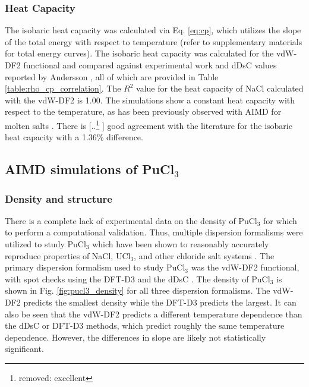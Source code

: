 \documentclass[review]{elsarticle}
\providecommand{\DIFaddtex}[1]{{\protect\color{blue} \sf #1}} %
\providecommand{\DIFdeltex}[1]{{\protect\color{red} [..\footnote{removed: #1} ]}} %
\providecommand{\DIFaddbegin}{} %
\providecommand{\DIFaddend}{} %
\providecommand{\DIFdelbegin}{} %
\providecommand{\DIFdelend}{} %
\providecommand{\DIFadd}[1]{\texorpdfstring{\DIFaddtex{#1}}{#1}} %
\providecommand{\DIFdel}[1]{\texorpdfstring{\DIFdeltex{#1}}{}} %
\newcommand{\DIFscaledelfig}{0.5}
\newlength{\DIFdelgraphicswidth} %
\newlength{\DIFdelgraphicsheight} %
\newcommand{\DIFaddincludegraphics}[2][]{{\color{blue}\fbox{\DIFOincludegraphics[#1]{#2}}}} %
\newcommand{\DIFdelincludegraphics}[2][]{%
\sbox{\DIFdelgraphicsbox}{\DIFOincludegraphics[#1]{#2}}%
\settoboxwidth{\DIFdelgraphicswidth}{\DIFdelgraphicsbox} %
\settoboxtotalheight{\DIFdelgraphicsheight}{\DIFdelgraphicsbox} %
\scalebox{\DIFscaledelfig}{%
\parbox[b]{\DIFdelgraphicswidth}{\usebox{\DIFdelgraphicsbox}\\[-\baselineskip] \rule{\DIFdelgraphicswidth}{0em}}\llap{\resizebox{\DIFdelgraphicswidth}{\DIFdelgraphicsheight}{%
\setlength{\unitlength}{\DIFdelgraphicswidth}%
\begin{picture}(1,1)%
\thicklines\linethickness{2pt} %
{\color[rgb]{1,0,0}\put(0,0){\framebox(1,1){}}}%
{\color[rgb]{1,0,0}\put(0,0){\line( 1,1){1}}}%
{\color[rgb]{1,0,0}\put(0,1){\line(1,-1){1}}}%
\end{picture}%
}\hspace*{3pt}}} %
} %
\DeclareRobustCommand{\DIFaddbegin}{\DIFOaddbegin \let\includegraphics\DIFaddincludegraphics} %
\DeclareRobustCommand{\DIFaddend}{\DIFOaddend \let\includegraphics\DIFOincludegraphics} %
\DeclareRobustCommand{\DIFdelbegin}{\DIFOdelbegin \let\includegraphics\DIFdelincludegraphics} %
\DeclareRobustCommand{\DIFdelend}{\DIFOaddend \let\includegraphics\DIFOincludegraphics} %
\begin{document}
\subsubsection{Heat Capacity}
The isobaric heat capacity was calculated via Eq. \ref{eq:cp}, which utilizes the slope of the total energy with respect to temperature \DIFaddbegin \DIFadd{(refer to supplementary materials for total energy curves)}\DIFaddend . The isobaric heat capacity was calculated for the vdW-DF2 functional and compared against experimental work \cite{nist_ref} and dDsC values reported by Andersson \cite{ANDERSSON2022153836}, all of which are provided in Table \ref{table:rho_cp_correlation}. The $R^2$ value for the heat capacity of NaCl calculated with the vdW-DF2 is 1.00. The simulations show a constant heat capacity with respect to the temperature, as has been previously observed with AIMD for molten salts \cite{duemmler_naclmgcl, karlsson2022synthesis, yuan2019specific, redkin2015heat}. There is \DIFdelbegin \DIFdel{excellent }\DIFdelend \DIFaddbegin \DIFadd{good }\DIFaddend agreement with the literature for the isobaric heat capacity with a 1.36\% difference. 

\subsection{AIMD simulations of PuCl$_3$}
\subsubsection{Density and structure}
There is a complete lack of experimental data on the density of PuCl$_3$ for which to perform a computational validation. Thus, multiple dispersion formalisms were utilized to study PuCl$_3$ which have been shown to reasonably accurately reproduce properties of NaCl, UCl$_3$, and other chloride salt systems \cite{duemmler_liclkcl,duemmler_naclmgcl, ANDERSSON2022153836}. The primary dispersion formalism used to study PuCl$_3$ was the vdW-DF2 functional, with spot checks using the DFT-D3\cite{Grimme2010,grimme2011effect} and the dDsC \cite{steinmann2011comprehensive, steinmann2011generalized}. The density of PuCl$_3$ is shown in Fig. \ref{fig:pucl3_density} for all three dispersion formalisms. The vdW-DF2 predicts the smallest density while the DFT-D3 predicts the largest. It can also be seen that the vdW-DF2 predicts a different temperature dependence than the dDsC or DFT-D3 methods, which predict roughly the same temperature dependence. However, the differences in slope are likely not statistically significant. 
\end{document}
